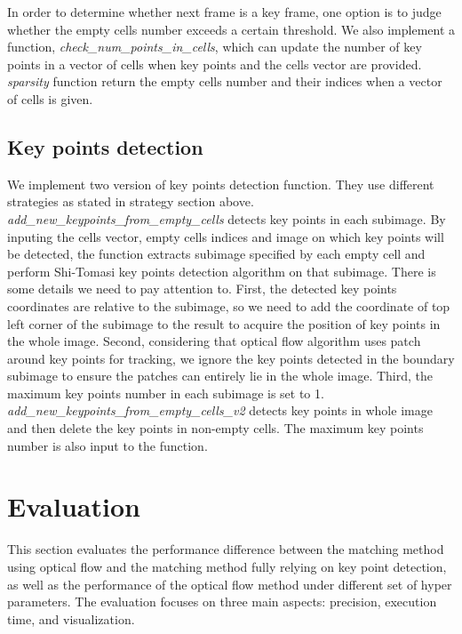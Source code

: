\documentclass{easychair}
\begin{document}
In order to determine whether next frame is a key frame, one option is to judge whether the empty cells number exceeds a certain threshold. We also implement a function, \emph{check\_num\_points\_in\_cells}, which can update the number of key points in a vector of cells when key points and the cells vector are provided.  \emph{sparsity} function return the empty cells number and their indices when a vector of cells is given. \\

\subsection{Key points detection}
We implement two version of key points detection function. They use different strategies as stated in strategy section above. \\

\emph{add\_new\_keypoints\_from\_empty\_cells} detects key points in each subimage. By inputing the cells vector, empty cells indices and image on which key points will be detected, the function extracts subimage specified by each empty cell and perform Shi-Tomasi key points detection algorithm on that subimage. There is some details we need to pay attention to. First, the detected key points coordinates are relative to the subimage, so we need to add the coordinate of top left corner of the subimage to the result to acquire the position of key points in the whole image. Second, considering that optical flow algorithm uses patch around key points for tracking, we ignore the key points detected in the boundary subimage to ensure the patches can entirely lie in the whole image. Third, the maximum key points number in each subimage is set to 1.\\

\emph{add\_new\_keypoints\_from\_empty\_cells\_v2} detects key points in whole image and then delete the key points in non-empty cells. The maximum key points number is also input to the function.\\

\section{Evaluation}
This section evaluates the performance difference between the matching method using optical flow and the matching method fully relying on key point detection, as well as the performance of the optical flow method under different set of hyper parameters. The evaluation focuses on three main aspects: precision, execution time, and visualization.
\end{document}
